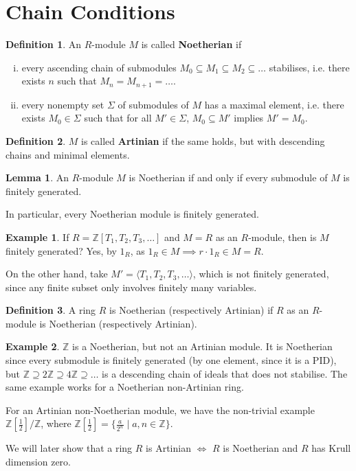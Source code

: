 \documentclass{article}
\theoremstyle{definition}
\newtheorem{lemma}[theorem]{Lemma}
\newtheorem{example}{Example}[section]
\newtheorem{defn}{Definition}[section]
\begin{document}
\section{Chain Conditions}
\begin{defn}
    An $R$-module $M$ is called \textbf{Noetherian} if 
    \begin{enumerate}[(i)]
        \item every ascending chain of submodules $M_0 \subseteq M_1 \subseteq M_2 \subseteq \dots$ stabilises, i.e. there exists $n$ such that $M_n = M_{n+1} = \dots$.
        \item every nonempty set $\Sigma$ of submodules of $M$ has a maximal element, i.e. there exists $M_0 \in \Sigma$ such that for all $M' \in \Sigma$, $M_0 \subseteq M'$ implies $M' = M_0$.
    \end{enumerate}
\end{defn}
\begin{defn}
    $M$ is called \textbf{Artinian} if the same holds, but with descending chains and minimal elements.
\end{defn}
\begin{lemma}
    An $R$-module $M$ is Noetherian if and only if every submodule of $M$ is finitely generated.
\end{lemma}
In particular, every Noetherian module is finitely generated.
\begin{example}
    If $R = \mathbb{Z}[T_1,T_2,T_3,\ldots]$ and $M=R$ as an $R$-module, then is $M$ finitely generated? Yes, by $1_R$, as $1_R \in M \implies r \cdot 1_R \in M = R$.
    \vspace{1mm}
     
    On the other hand, take $M' = \langle T_1,T_2,T_3, \ldots \rangle$, which is not finitely generated, since any finite subset only involves finitely many variables.
\end{example}
\begin{defn}
    A ring $R$ is Noetherian (respectively Artinian) if $R$ as an $R$-module is Noetherian (respectively Artinian).
\end{defn}
\begin{example}
    $\mathbb{Z}$ is a Noetherian, but not an Artinian module. It is Noetherian since every submodule is finitely generated (by one element, since it is a PID), but $\mathbb{Z} \supseteq 2\mathbb{Z} \supseteq 4\mathbb{Z} \supseteq \dots$ is a descending chain of ideals that does not stabilise. The same example works for a Noetherian non-Artinian ring.
    \vspace{1mm}
     
    For an Artinian non-Noetherian module, we have the non-trivial example $\mathbb{Z}[\frac{1}{2}]/\mathbb{Z}$, where $\mathbb{Z}[\frac{1}{2}] = \{\frac{a}{2^n} \mid a,n \in \mathbb{Z} \}$.
\end{example}
We will later show that a ring $R$ is Artinian $\iff$ $R$ is Noetherian and $R$ has Krull dimension zero.
\end{document}
